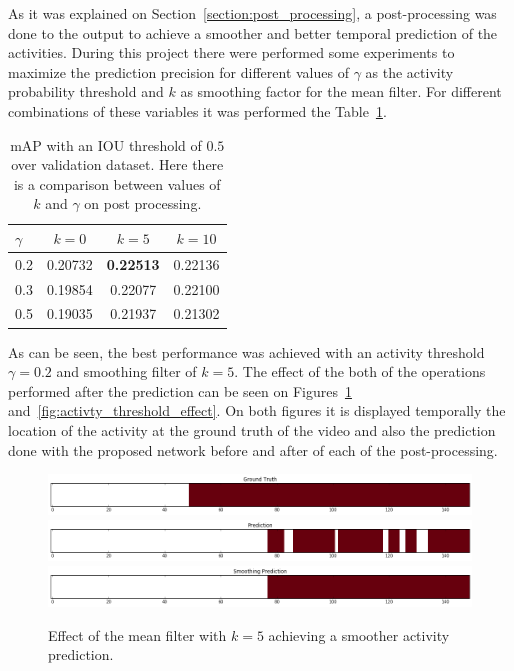 As it was explained on Section~\ref{section:post_processing}, a post-processing was done to the output to achieve a smoother and better temporal prediction of the activities. During this project there were performed some experiments to maximize the prediction precision for different values of $\gamma$ as the activity probability threshold and $k$ as smoothing factor for the mean filter. For different combinations of these variables it was performed the Table~\ref{table:detection_postprocessing_comparison}.

\begin{table}[H]
\begin{center}
\begin{tabular}{|l|c|c|c|}
\hline
$\gamma$ & $k=0$ & $k=5$ & $k=10$ \\
\hline
0.2 & 0.20732 & \bf0.22513 & 0.22136 \\
0.3 & 0.19854 & 0.22077 & 0.22100 \\
0.5 & 0.19035 & 0.21937 & 0.21302 \\
\hline
\end{tabular}
\end{center}
\caption{mAP with an IOU threshold of $0.5$ over validation dataset. Here there is a comparison
between values of $k$ and $\gamma$ on post processing.}
\label{table:detection_postprocessing_comparison}
\end{table}

As can be seen, the best performance was achieved with an activity threshold $\gamma=0.2$ and smoothing filter of $k=5$. The effect of the both of the operations performed after the prediction can be seen on Figures~\ref{fig:smoothing_effect} and~\ref{fig:activty_threshold_effect}. On both figures it is displayed temporally the location of the activity at the ground truth of the video and also the prediction done with the proposed network before and after of each of the post-processing.

\begin{figure}[ht]
\begin{center}
\includegraphics[width=1\linewidth]{img/results/smoothing_effect_4}
\includegraphics[width=1\linewidth]{img/results/smoothing_effect_5}
\includegraphics[width=1\linewidth]{img/results/smoothing_effect_6}
\end{center}
\caption{Effect of the mean filter with $k=5$ achieving a smoother activity prediction.}
\label{fig:smoothing_effect}
\end{figure}

